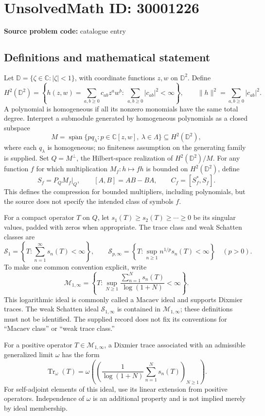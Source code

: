 \documentclass[11pt]{article}
\newcommand{\C}{\mathbb{C}}
\begin{document}
\section*{UnsolvedMath ID: 30001226}
\textbf{Source problem code:} catalogue entry
\subsection{Definitions and mathematical statement}
Let \(\mathbb D=\{\zeta\in\C:|\zeta|<1\}\), with coordinate functions \(z,w\) on \(\mathbb D^2\). Define
\[
H^2(\mathbb D^2)=\left\{h(z,w)=\sum_{a,b\geq0}c_{ab}z^aw^b:\ \sum_{a,b\geq0}|c_{ab}|^2<\infty\right\},
\qquad \|h\|^2=\sum_{a,b\geq0}|c_{ab}|^2.
\]
A polynomial is homogeneous if all its nonzero monomials have the same total degree. Interpret a submodule generated by homogeneous polynomials as a closed subspace
\[
M=\overline{\operatorname{span}}\{p q_\lambda:p\in\C[z,w],\ \lambda\in\Lambda\}\subseteq H^2(\mathbb D^2),
\]
where each \(q_\lambda\) is homogeneous; no finiteness assumption on the generating family is supplied. Set \(Q=M^\perp\), the Hilbert-space realization of \(H^2(\mathbb D^2)/M\). For any function \(f\) for which multiplication \(M_f:h\mapsto fh\) is bounded on \(H^2(\mathbb D^2)\), define
\[
S_f=P_QM_f\big|_Q,\qquad [A,B]=AB-BA,\qquad C_f=[S_f^*,S_f].
\]
This defines the compression for bounded multipliers, including polynomials, but the source does not specify the intended class of symbols \(f\).

For a compact operator \(T\) on \(Q\), let \(s_1(T)\geq s_2(T)\geq\cdots\geq0\) be its singular values, padded with zeros when appropriate. The trace class and weak Schatten classes are
\[
\mathcal S_1=\left\{T:\sum_{n=1}^{\infty}s_n(T)<\infty\right\},\qquad
\mathcal S_{p,\infty}=\left\{T:\sup_{n\geq1}n^{1/p}s_n(T)<\infty\right\}\quad(p>0).
\]
To make one common convention explicit, write
\[
\mathcal M_{1,\infty}=\left\{T:\sup_{N\geq1}\frac{\sum_{n=1}^{N}s_n(T)}{\log(1+N)}<\infty\right\}.
\]
This logarithmic ideal is commonly called a Macaev ideal and supports Dixmier traces. The weak Schatten ideal \(\mathcal S_{1,\infty}\) is contained in \(\mathcal M_{1,\infty}\); these definitions must not be identified. The supplied record does not fix its conventions for ``Macaev class'' or ``weak trace class.''

For a positive operator \(T\in\mathcal M_{1,\infty}\), a Dixmier trace associated with an admissible generalized limit \(\omega\) has the form
\[
\operatorname{Tr}_{\omega}(T)=\omega\!\left(\left(\frac{1}{\log(1+N)}\sum_{n=1}^{N}s_n(T)\right)_{N\geq1}\right).
\]
For self-adjoint elements of this ideal, use its linear extension from positive operators. Independence of \(\omega\) is an additional property and is not implied merely by ideal membership.
\end{document}
